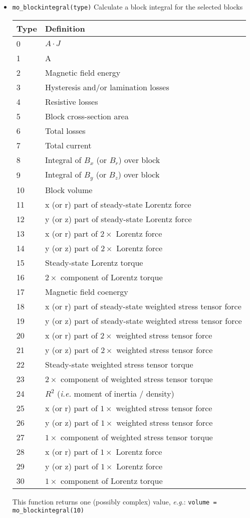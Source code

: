 \begin{itemize}
\item{\tt mo\_blockintegral(type)}
Calculate a block integral for the selected blocks
\begin{center}
\begin{tabular}{ll} \hline
 Type & Definition \\ \hline
 0 & $A \cdot J$ \\
 1 & A \\
 2 & Magnetic field energy \\
 3 & Hysteresis and/or lamination losses \\
 4 & Resistive losses \\
 5 & Block cross-section area \\
 6 & Total losses \\
 7 & Total current \\
 8 & Integral of $B_x$ (or $B_r$) over block \\
 9 & Integral of $B_y$ (or $B_z$) over block \\
 10 & Block volume \\
 11 & x (or r) part of steady-state Lorentz force \\
 12 & y (or z) part of steady-state Lorentz force \\
 13 & x (or r) part of $2\times$ Lorentz force \\
 14 & y (or z) part of $2\times$ Lorentz force \\
 15 & Steady-state Lorentz torque \\
 16 & $2 \times$ component of Lorentz torque \\
 17 & Magnetic field coenergy \\
 18 & x (or r) part of steady-state weighted stress tensor force \\
 19 & y (or z) part of steady-state weighted stress tensor force \\
 20 & x (or r) part of $2\times$ weighted stress tensor force \\
 21 & y (or z) part of $2\times$ weighted stress tensor force \\
 22 & Steady-state weighted stress tensor torque \\
 23 & $2 \times$ component of weighted stress tensor torque \\
 24 & $R^2$ ({\em i.e.} moment of inertia / density) \\ 
 25 & x (or r) part of $1\times$ weighted stress tensor force \\
 26 & y (or z) part of $1\times$ weighted stress tensor force \\
 27 & $1 \times$ component of weighted stress tensor torque \\
 28 & x (or r) part of $1\times$ Lorentz force \\
 29 & y (or z) part of $1\times$ Lorentz force \\
 30 & $1 \times$ component of Lorentz torque \\ \hline
 \end{tabular}
 \end{center}
This function returns one (possibly complex) value, {\em
e.g.}: {\tt volume = mo\_blockintegral(10)}



\end{itemize}
